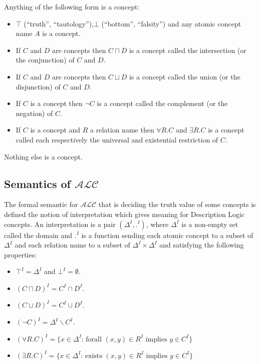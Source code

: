 Anything of the following form is a concept:
\begin{itemize}
\item $\top$ (``truth'', ``tautology''),$\bot$ (``bottom'', ``falsity'') and any atomic concept name $A$ is a concept.
\item If $C$ and $D$ are concepts then $C \sqcap D$ is a concept
  called the intersection (or the conjunction) of $C$ and $D$.
\item If $C$ and $D$ are concepts then $C \sqcup D$ is a concept
  called the union (or the disjunction) of $C$ and $D$.
\item If $C$ is a concept then $\neg C$ is a concept called the complement (or the
  negation) of $C$.
\item If $C$ is a concept and $R$ a relation name then $\forall R . C$
  and $\exists R . C$ is a concept called each respectively the
  universal and existential restriction of $C$.
\end{itemize}

Nothing else is a concept.

\subsection{Semantics of $\mathcal{ALC}$}

The formal semantic for $\mathcal{ALC}$ that is deciding the truth
value of some concepts is defined the notion of interpretation which
gives meaning for Description Logic concepts. An interpretation is a
pair $(\Delta^{I},.^{I})$, where $\Delta^{I}$ is a non-empty set
called the domain and $.^{I}$ is a function sending each atomic
concept to a subset of $\Delta^{I}$ and each relation name to a subset
of $\Delta^{I} \times \Delta^{I}$ and satisfying the following
properties:

\begin{itemize}
\item $\top^{I} = \Delta^{I}$ and $\bot^{I} = \emptyset$.
\item $(C \sqcap D)^{I} = C^{I} \cap D^{I}$.
\item $(C \sqcup D)^{I} = C^{I} \cup D^{I}$.
\item $(\neg C)^{I} = \Delta^{I} \backslash C^{I}$.
\item $(\forall R . C)^{I} = \{x \in \Delta^{I} \text{: forall } (x,y) \in R^{I} \text{ implies } y \in C^{I}\}$ 
\item $(\exists R . C)^{I} = \{x \in \Delta^{I} \text{: exists } (x,y) \in R^{I} \text{ implies } y \in C^{I}\}$ 
\end{itemize}

